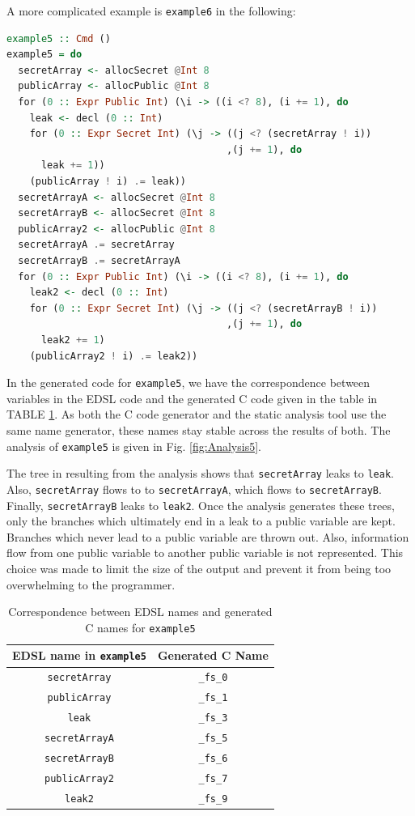 \documentclass[10pt, conference]{IEEEtran}
\newcommand{\ttt}{\texttt}
\begin{document}
A more complicated example is \ttt{example6} in the following:

\begin{lstlisting}[language=Haskell]
example5 :: Cmd ()
example5 = do
  secretArray <- allocSecret @Int 8
  publicArray <- allocPublic @Int 8
  for (0 :: Expr Public Int) (\i -> ((i <? 8), (i += 1), do
    leak <- decl (0 :: Int)
    for (0 :: Expr Secret Int) (\j -> ((j <? (secretArray ! i))
                                      ,(j += 1), do
      leak += 1))
    (publicArray ! i) .= leak))
  secretArrayA <- allocSecret @Int 8
  secretArrayB <- allocSecret @Int 8
  publicArray2 <- allocPublic @Int 8
  secretArrayA .= secretArray
  secretArrayB .= secretArrayA
  for (0 :: Expr Public Int) (\i -> ((i <? 8), (i += 1), do
    leak2 <- decl (0 :: Int)
    for (0 :: Expr Secret Int) (\j -> ((j <? (secretArrayB ! i))
                                      ,(j += 1), do
      leak2 += 1)
    (publicArray2 ! i) .= leak2))
\end{lstlisting}

In the generated code for \ttt{example5}, we have the correspondence between variables in the EDSL code and the
generated C code given in the table in TABLE \ref{table:Names5}. As both the C code generator and the
static analysis tool use the same name generator, these names stay stable across the results of both. The analysis of \ttt{example5} is given in Fig. \ref{fig:Analysis5}.

The tree in resulting from the analysis shows that \ttt{secretArray} leaks to \ttt{leak}. Also, \ttt{secretArray} flows to
to \ttt{secretArrayA}, which flows to \ttt{secretArrayB}. Finally, \ttt{secretArrayB} leaks to \ttt{leak2}. Once
the analysis generates these trees, only the branches which ultimately end in a leak to a public variable
are kept. Branches which never lead to a public variable are thrown out. Also, information flow from one
public variable to another public variable is not represented. This choice was made to limit the size
of the output and prevent it from being too overwhelming to the programmer.

\begin{table}
  \centering
  \begin{tabular}{|c|c|}
    \hline
    EDSL name in \ttt{example5} & Generated C Name \\
    \hline
    \verb|secretArray| & \verb|_fs_0|\\
    \verb|publicArray| & \verb|_fs_1|\\
    \verb|leak| & \verb|_fs_3|\\
    \verb|secretArrayA| & \verb|_fs_5|\\
    \verb|secretArrayB| & \verb|_fs_6|\\
    \verb|publicArray2| & \verb|_fs_7|\\
    \verb|leak2| & \verb|_fs_9|\\
    \hline
  \end{tabular}
\caption{Correspondence between EDSL names and generated C names for \ttt{example5}}
\label{table:Names5}
\end{table}
\end{document}
